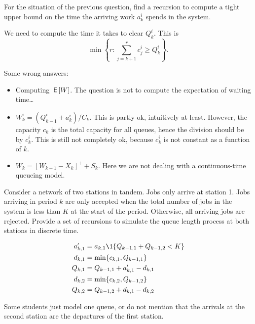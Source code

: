 \begin{exercise}[201704]
For the situation of the previous question, find a recursion to compute a tight upper bound on the time the arriving work $a_k^i$ spends in the system.
\begin{solution}
We need to compute the time it takes to clear $Q_k^i$. This is
\begin{equation*}
 \min\left\{r: \sum_{j=k+1}^r c_j^i \geq Q_k^i\right\}.
\end{equation*}

Some wrong answers:
\begin{itemize}
\item Computing $\,\mathsf{E}\left[W\right]$. The question is not to compute the expectation of waiting time\ldots
\item $W_k^i=(Q_{k-1}^i+a_k^i)/C_k$. This is partly ok, intuitively at least. However, the capacity $c_k$ is the total capacity for all queues, hence the division should be by $c_k^i$. This is still not completely ok, because $c_k^i$ is not constant as a function of $k$.
\item $W_k = [W_{k-1}-X_k]^+ + S_k$. Here we are not dealing with a continuous-time queueing model. 
\end{itemize}
\end{solution}
\end{exercise}


\begin{exercise}[201807]
Consider a network of two stations in tandem. Jobs only arrive at station 1. Jobs arriving in period $k$ are only accepted when the total number of jobs in the system is less than $K$ at the start of the period. Otherwise, all arriving jobs are rejected. Provide a set of recursions to simulate the queue length process at both stations in discrete time. 

\begin{solution}
 \begin{align*}
a_{k,1}' &= a_{k,1}\1{Q_{k-1, 1} + Q_{k-1,2} < K} \\
 d_{k,1} &= \min\{c_{k,1}, Q_{k-1, 1}\} \\
 Q_{k,1} &= Q_{k-1,1} + a_{k,1}' - d_{k,1}\\
 d_{k,2} &= \min\{c_{k,2}, Q_{k-1, 2}\} \\
 Q_{k,2} &= Q_{k-1,2} + d_{k,1} - d_{k,2}\\
 \end{align*}

Some students just model one queue, or do not mention that the arrivals at the second station are the departures of the first station.
\end{solution}
\end{exercise}


